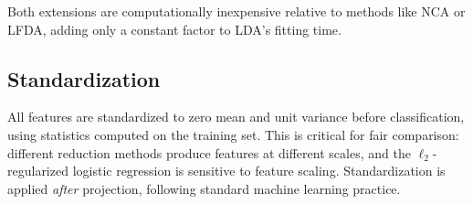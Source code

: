 Both extensions are computationally inexpensive relative to methods like NCA or LFDA, adding only a constant factor to LDA's fitting time.

\subsection{Standardization}

All features are standardized to zero mean and unit variance before classification, using statistics computed on the training set. This is critical for fair comparison: different reduction methods produce features at different scales, and the $\ell_2$-regularized logistic regression is sensitive to feature scaling. Standardization is applied \emph{after} projection, following standard machine learning practice.
